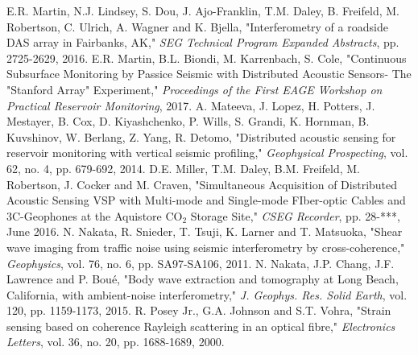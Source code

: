 \documentclass[11pt]{article}
\begin{document}
\begin{thebibliography}{30}
\vspace{-0.2cm}
 E.R. Martin, N.J. Lindsey, S. Dou, J. Ajo-Franklin, T.M. Daley, B. Freifeld, M. Robertson, C. Ulrich, A. Wagner and K. Bjella, "Interferometry of a roadside DAS array in Fairbanks, AK," \textit{SEG Technical Program Expanded Abstracts}, pp. 2725-2629, 2016.
\vspace{-0.2cm}
 E.R. Martin, B.L. Biondi, M. Karrenbach, S. Cole, "Continuous Subsurface Monitoring by Passice Seismic with Distributed Acoustic Sensors- The "Stanford Array" Experiment," \textit{Proceedings of the First EAGE Workshop on Practical Reservoir Monitoring}, 2017.
\vspace{-0.2cm}
 A. Mateeva, J. Lopez, H. Potters, J. Mestayer, B. Cox, D. Kiyashchenko, P. Wills, S. Grandi, K. Hornman, B. Kuvshinov, W. Berlang, Z. Yang, R. Detomo, "Distributed acoustic sensing for reservoir monitoring with vertical seismic profiling," \textit{Geophysical Prospecting}, vol. 62, no. 4, pp. 679-692, 2014.
\vspace{-0.2cm}
 D.E. Miller, T.M. Daley, B.M. Freifeld, M. Robertson, J. Cocker and M. Craven, "Simultaneous Acquisition of Distributed Acoustic Sensing VSP with Multi-mode and Single-mode FIber-optic Cables and 3C-Geophones at the Aquistore CO$_2$ Storage Site," \textit{CSEG Recorder}, pp. 28-***, June 2016.
\vspace{-0.2cm}
 N. Nakata, R. Snieder, T. Tsuji, K. Larner and T. Matsuoka, "Shear wave imaging from traffic noise using seismic interferometry by cross-coherence," \textit{Geophysics}, vol. 76, no. 6, pp. SA97-SA106, 2011.
\vspace{-0.2cm}
 N. Nakata, J.P. Chang, J.F. Lawrence and P. Bou\'{e}, "Body wave extraction and tomography at Long Beach, California, with ambient-noise interferometry," \textit{J. Geophys. Res. Solid Earth}, vol. 120, pp. 1159-1173, 2015.
\vspace{-0.2cm}
 R. Posey Jr., G.A. Johnson and S.T. Vohra, "Strain sensing based on coherence Rayleigh scattering in an optical fibre," \textit{Electronics Letters}, vol. 36, no. 20, pp. 1688-1689, 2000.

\end{thebibliography}
\end{document}
